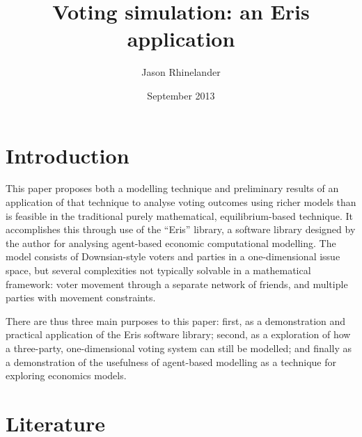 \documentclass[12pt]{article}
\title{Voting simulation: an Eris application}
\date{September 2013}
\author{Jason Rhinelander}
\numberwithin{equation}{subsection}
\begin{document}
\maketitle
\thispagestyle{empty}



\section{Introduction}

This paper proposes both a modelling technique and preliminary results of an application of that
technique to analyse voting outcomes using richer models than is feasible in the traditional purely
mathematical, equilibrium-based technique.  It accomplishes this through use of the ``Eris''
library, a software library designed by the author for analysing agent-based economic computational
modelling.  The model consists of Downsian-style voters and parties in a one-dimensional issue
space, but several complexities not typically solvable in a mathematical framework: voter movement
through a separate network of friends, and multiple parties with movement constraints.

There are thus three main purposes to this paper: first, as a demonstration and practical
application of the Eris software library; second, as a exploration of how a three-party,
one-dimensional voting system can still be modelled; and finally as a demonstration of the
usefulness of agent-based modelling as a technique for exploring economics models.

\section{Literature}
\end{document}
